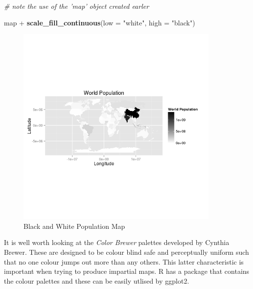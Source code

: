 \documentclass[]{article}
\newenvironment{Shaded}{}{}
\newcommand{\KeywordTok}[1]{\textcolor[rgb]{0.00,0.44,0.13}{\textbf{{#1}}}}
\newcommand{\DataTypeTok}[1]{\textcolor[rgb]{0.56,0.13,0.00}{{#1}}}
\newcommand{\StringTok}[1]{\textcolor[rgb]{0.25,0.44,0.63}{{#1}}}
\newcommand{\CommentTok}[1]{\textcolor[rgb]{0.38,0.63,0.69}{\textit{{#1}}}}
\newcommand{\NormalTok}[1]{{#1}}
\let\Oldincludegraphics\includegraphics
\renewcommand{\includegraphics}[1]{\Oldincludegraphics[width=10cm]{#1}}
\begin{document}
\begin{Shaded}
\begin{Highlighting}[]
\CommentTok{# note the use of the 'map' object created earler}

\NormalTok{map + }\KeywordTok{scale_fill_continuous}\NormalTok{(}\DataTypeTok{low =} \StringTok{"white"}\NormalTok{, }\DataTypeTok{high =} \StringTok{"black"}\NormalTok{)}
\end{Highlighting}
\end{Shaded}
\begin{figure}[htbp]
\centering
\includegraphics{figure/Black_and_White_Population_Map.png}
\caption{Black and White Population Map}
\end{figure}

It is well worth looking at the \emph{Color Brewer} palettes developed
by Cynthia Brewer. These are designed to be colour blind safe and
perceptually uniform such that no one colour jumps out more than any
others. This latter characteristic is important when trying to produce
impartial maps. R has a package that contains the colour palettes and
these can be easily utlised by ggplot2.
\end{document}
